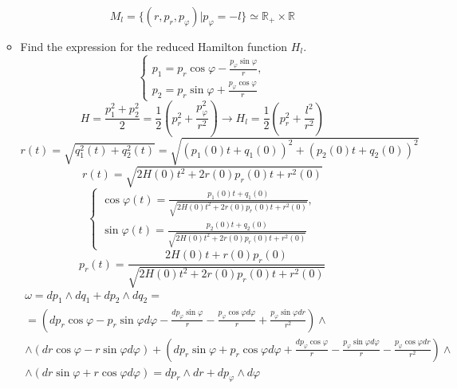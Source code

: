 \documentclass[12pt]{article}
\theoremstyle{definition}
\begin{document}
\begin{enumerate}
\begin{itemize}
\begin{equation}
        \end{equation}
        \begin{equation}
            \boxed{M_l=\{(r,p_r,p_\varphi)|p_\varphi=-l\}\simeq\mathbb{R}_+\times\mathbb{R}}
        \end{equation}
        \item Find the expression for the reduced Hamilton function $H_l$.
        \begin{equation}
            \begin{cases}
                p_1=p_r\cos\varphi-\frac{p_\varphi\sin\varphi}{r},\\
                p_2=p_r\sin\varphi+\frac{p_\varphi\cos\varphi}{r}
            \end{cases}
        \end{equation}
        \begin{equation}
            H=\frac{p_1^2+p_2^2}{2}=\frac{1}{2}\left(p_r^2+\frac{p_\varphi^2}{r^2}\right)\rightarrow \boxed{H_l=\frac{1}{2}\left(p_r^2+\frac{l^2}{r^2}\right)}
        \end{equation}
        \begin{equation}
            r(t)=\sqrt{q_1^2(t)+q_2^2(t)}=\sqrt{(p_1(0)t+q_1(0))^2+(p_2(0)t+q_2(0))^2}
        \end{equation}
        \begin{equation}
            \boxed{r(t)=\sqrt{2H(0)t^2+2r(0)p_r(0)t+r^2(0)}}
        \end{equation}
        \begin{equation}
            \begin{cases}
                \cos\varphi(t)=\frac{p_1(0)t+q_1(0)}{\sqrt{2H(0)t^2+2r(0)p_r(0)t+r^2(0)}},\\
                \sin\varphi(t)=\frac{p_2(0)t+q_2(0)}{\sqrt{2H(0)t^2+2r(0)p_r(0)t+r^2(0)}}
            \end{cases}
        \end{equation}
        \begin{equation}
            \boxed{p_r(t)=\frac{2H(0)t+r(0)p_r(0)}{\sqrt{2H(0)t^2+2r(0)p_r(0)t+r^2(0)}}}
        \end{equation}
        \begin{multline}
            \omega=dp_1\wedge dq_1+dp_2\wedge dq_2=\\=\left(dp_r\cos\varphi-p_r\sin\varphi d\varphi-\frac{dp_\varphi\sin\varphi}{r}-\frac{p_\varphi\cos\varphi d\varphi}{r}+\frac{p_\varphi\sin\varphi dr}{r^2}\right)\wedge\\\wedge(dr\cos\varphi-r\sin\varphi d\varphi)+\left(dp_r\sin\varphi+p_r\cos\varphi d\varphi+\frac{dp_\varphi\cos\varphi}{r}-\frac{p_\varphi\sin\varphi d\varphi}{r}-\frac{p_\varphi\cos\varphi dr}{r^2}\right)\wedge\\\wedge(dr\sin\varphi+r\cos\varphi d\varphi)=dp_r\wedge dr+dp_\varphi\wedge d\varphi

\end{multline}
\end{itemize}
\end{enumerate}
\end{document}
